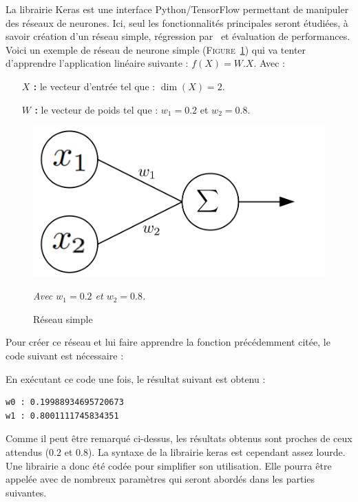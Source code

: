 La librairie Keras est une interface Python/TensorFlow\cite{tf} permettant de manipuler des réseaux de neurones.
Ici, seul les fonctionnalités principales seront étudiées,
à savoir
création d'un réseau simple,
régression par \sgd\
et évaluation de performances.\\


Voici un exemple de réseau de neurone simple (\textsc{Figure}\ \ref{fig:net2})
qui va tenter d'apprendre l'application linéaire suivante : $f(X) = W.X$.
Avec :
\begin{itemize}
    \item[\textbf{$X$ :}] le vecteur d'entrée tel que : $\dim(X) = 2$.
    \item[\textbf{$W$ :}] le vecteur de poids tel que : $w_1 = 0.2$ et $w_2 = 0.8$.
\end{itemize}
\begin{figure}[H]
    \center
    \includegraphics[height=\moyen]{pict/net2.png}
	\caption{Réseau simple}
    \vspace{-10pt}
    \begin{center}
        \tiny
        \textit{
        Avec $w_1 = 0.2$ et $w_2 = 0.8$.
        }
    \end{center}
	\label{fig:net2}
\end{figure}
\vspace{-12pt}


Pour créer ce réseau et lui faire apprendre la fonction précédemment citée,
le code suivant est nécessaire :



En exécutant ce code une fois, le résultat suivant est obtenu :
\begin{lstlisting}
w0 : 0.19988934695720673
w1 : 0.8001111745834351
\end{lstlisting}

Comme il peut être remarqué ci-dessus, les résultats obtenus sont proches de ceux attendus ($0.2$ et $0.8$).
La syntaxe de la librairie keras est cependant assez lourde.
Une librairie a donc été codée pour simplifier son utilisation.
Elle pourra être appelée avec de nombreux paramètres qui seront abordés dans les parties suivantes.\\


